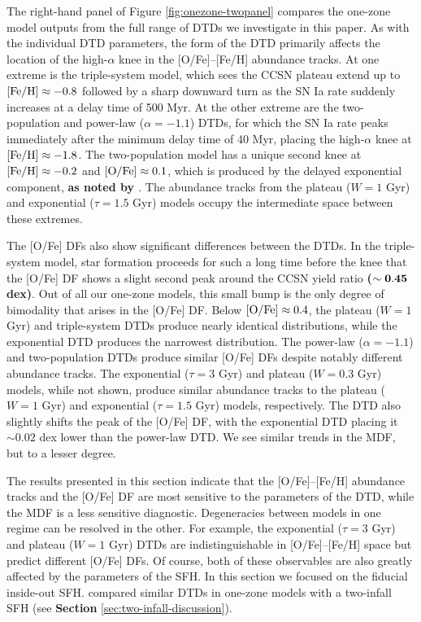 \documentclass[twocolumn,twocolappendix,linenumbers]{aastex631}
\begin{document}
The right-hand panel of Figure \ref{fig:onezone-twopanel} compares the one-zone model outputs from the full range of DTDs we investigate in this paper. As with the individual DTD parameters, the form of the DTD primarily affects the location of the high-$\alpha$ knee in the [O/Fe]--[Fe/H] abundance tracks. At one extreme is the triple-system model, which sees the CCSN plateau extend up to ${\rm [Fe/H]}\approx-0.8$ followed by a sharp downward turn as the SN Ia rate suddenly increases at a delay time of 500 Myr. 
At the other extreme are the two-population and power-law ($\alpha=-1.1$) DTDs, for which the SN Ia rate peaks immediately after the minimum delay time of 40 Myr, placing the high-$\alpha$ knee at ${\rm [Fe/H]}\approx-1.8$. The two-population model has a unique second knee at ${\rm [Fe/H]}\approx-0.2$ and ${\rm [O/Fe]}\approx0.1$, which is produced by the delayed exponential component, {\bf as noted by \citet{Vincenzo2017-ChemicalEvolution}}. The abundance tracks from the plateau ($W=1$ Gyr) and exponential ($\tau=1.5$ Gyr) models occupy the intermediate space between these extremes. 

The [O/Fe] DFs also show significant differences between the DTDs. In the triple-system model, star formation proceeds for such a long time before the knee that the [O/Fe] DF shows a slight second peak around the CCSN yield ratio {\bf ($\bf \sim0.45$ dex)}. Out of all our one-zone models, this small bump is the only degree of bimodality that arises in the [O/Fe] DF. Below ${\rm [O/Fe]}\approx0.4$, the plateau ($W=1$ Gyr) and triple-system DTDs produce nearly identical distributions, while the exponential DTD produces the narrowest distribution. The power-law ($\alpha=-1.1$) and two-population DTDs produce similar [O/Fe] DFs despite notably different abundance tracks. The exponential ($\tau=3$ Gyr) and plateau ($W=0.3$ Gyr) models, while not shown, produce similar abundance tracks to the plateau ($W=1$ Gyr) and exponential ($\tau=1.5$ Gyr) models, respectively.
The DTD also slightly shifts the peak of the [O/Fe] DF, with the exponential DTD placing it $\sim 0.02$ dex lower than the power-law DTD. We see similar trends in the MDF, but to a lesser degree.

The results presented in this section indicate that the [O/Fe]--[Fe/H] abundance tracks and the [O/Fe] DF are most sensitive to the parameters of the DTD, while the MDF is a less sensitive diagnostic. Degeneracies between models in one regime can be resolved in the other. For example, the exponential ($\tau=3$ Gyr) and plateau ($W=1$ Gyr) DTDs are indistinguishable in [O/Fe]--[Fe/H] space but predict different [O/Fe] DFs. Of course, both of these observables are also greatly affected by the parameters of the SFH. In this section we focused on the fiducial inside-out SFH. \citet{Palicio2023-AnalyticDTD} compared similar DTDs in one-zone models with a two-infall SFH (see {\bf Section} \ref{sec:two-infall-discussion}).
\end{document}
